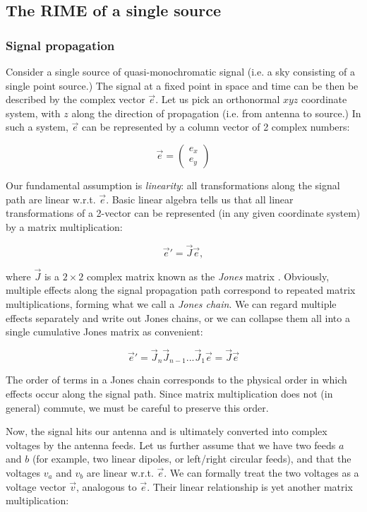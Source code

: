 \documentclass[]{aa}
\begin{document}
\subsection{The RIME of a single source}

\subsubsection{Signal propagation}

Consider a single source of quasi-monochromatic signal (i.e. a sky consisting of a single point source.) The signal at a fixed point in space and time can be then be described by the complex vector $\vec e$. Let us pick an orthonormal $xyz$ coordinate system, with $z$ along the direction of propagation (i.e. from antenna to source.) In such a system, $\vec e$ can be represented by a column vector of 2 complex numbers:

\[
\vec e = \left( \begin{array}{c}e_x\\e_y\end{array} \right) 
\]

Our fundamental assumption is {\em linearity}: all transformations along the signal path are linear w.r.t. $\vec e$. Basic linear algebra tells us that all linear transformations of a 2-vector can be represented (in any given coordinate system) by a matrix multiplication:

\[
\vec e' = \vec J \vec e,
\]

where $\vec J$ is a $2\times2$ complex matrix known as the {\em Jones} matrix \citep{jones}. Obviously, multiple effects along the signal propagation path correspond to repeated matrix multiplications, forming what we call a {\em Jones chain}. We can regard multiple effects separately and write out Jones chains, or we can collapse them all into a single cumulative Jones matrix as convenient:

\begin{equation}\label{eq:jones-chain}
\vec e' = \vec J_n \vec J_{n-1} ... \vec J_1 \vec e = \vec J \vec e
\end{equation}

The order of terms in a Jones chain corresponds to the physical order in which effects occur along the signal path. Since matrix multiplication does not (in general) commute, we must be careful to preserve this order. 

Now, the signal hits our antenna and is ultimately converted into complex voltages by the antenna feeds. Let us further assume that we have two feeds $a$ and $b$ (for example, two linear dipoles, or left/right circular feeds), and that the voltages $v_a$ and $v_b$ are linear w.r.t. $\vec e$. We can formally treat the two voltages as a voltage vector $\vec v$, analogous to $\vec e$. Their linear relationship is yet another matrix multiplication:
\end{document}
